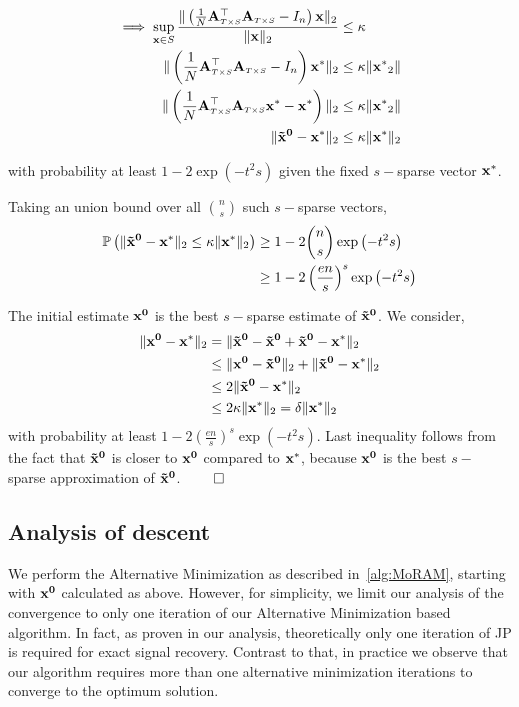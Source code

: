 {\begin{align*}
\implies \sup_{\mathbf{x} \in S} \frac{\|\left(\frac{1}{N} \mathbf{A}_{\scriptscriptstyle{T\times S}}^\top \mathbf{A}_{\scriptscriptstyle{T\times S}} - I_n\right)\mathbf{x}\|_2}{\|\mathbf{x}\|_2} &\leq \kappa \\
\|\left(\frac{1}{N} \mathbf{A}_{\scriptscriptstyle{T\times S}}^\top \mathbf{A}_{\scriptscriptstyle{T\times S}} - I_n\right)\mathbf{x^*}\|_2 &\leq \kappa \|\mathbf{x^*}_2\| \\
 \|\left(\frac{1}{N} \mathbf{A}_{\scriptscriptstyle{T\times S}}^\top \mathbf{A}_{\scriptscriptstyle{T\times S}}\mathbf{x^*} - \mathbf{x^*}\right)\|_2 &\leq \kappa \|\mathbf{x^*}_2\| \\
 \|\mathbf{\tilde{x}^0} - \mathbf{x^*}\|_2 &\leq \kappa \|\mathbf{x^*}\|_2 \\
\end{align*}

with probability at least $1 - 2\exp\left(-t^2s\right)$ given the fixed $s-$sparse vector $\mathbf{x^*}$.

Taking an union bound over all $n \choose s$ such $s-$sparse vectors,
\begin{align*}
\mathbb{P}\left(\|\mathbf{\tilde{x}^0} - \mathbf{x^*}\|_2 \leq \kappa \|\mathbf{x^*}\|_2\right) & \geq 1 - 2{n \choose s}\exp\left(-t^2s\right) \\ 
& \geq 1 - 2\left(\frac{en}{s}\right)^s\exp\left(-t^2s\right)
\end{align*}

The initial estimate $\mathbf{x^0}$ is the best $s-$sparse estimate of $\mathbf{\tilde{x}^0}$. We consider,
\begin{align*}
\|\mathbf{{x}^0} - \mathbf{x^*}\|_2 &=  \|\mathbf{\tilde{x}^0} -\mathbf{\tilde{x}^0} +\mathbf{\tilde{x}^0} - \mathbf{x^*}\|_2 \\
& \leq \|\mathbf{{x}^0} -\mathbf{\tilde{x}^0}\|_2 +  \|\mathbf{\tilde{x}^0} - \mathbf{x^*}\|_2 \\
& \leq 2 \|\mathbf{\tilde{x}^0} - \mathbf{x^*}\|_2 \\
& \leq 2 \kappa \|\mathbf{x^*}\|_2 = \delta \|\mathbf{x^*}\|_2
\end{align*}
with probability at least $1 - 2\left(\frac{en}{s}\right)^s\exp\left(-t^2s\right)$.
Last inequality follows from the fact that $\mathbf{\tilde{x}^0}$ is closer to $\mathbf{x^0}$ compared to $\mathbf{x^*}$, because $\mathbf{x^0}$ is the best $s-$sparse approximation of $\mathbf{\tilde{x}^0}$. $\qed$}

\subsection{Analysis of descent}
We perform the Alternative Minimization as described in~\ref{alg:MoRAM}, starting with $\mathbf{x^0}$ calculated as above. However, for simplicity, we limit our analysis of the convergence to only one iteration of our Alternative Minimization based algorithm. In fact, as proven in our analysis, theoretically only one iteration of JP is required for exact signal recovery. Contrast to that, in practice we observe that our algorithm requires more than one alternative minimization iterations to converge to the optimum solution.

